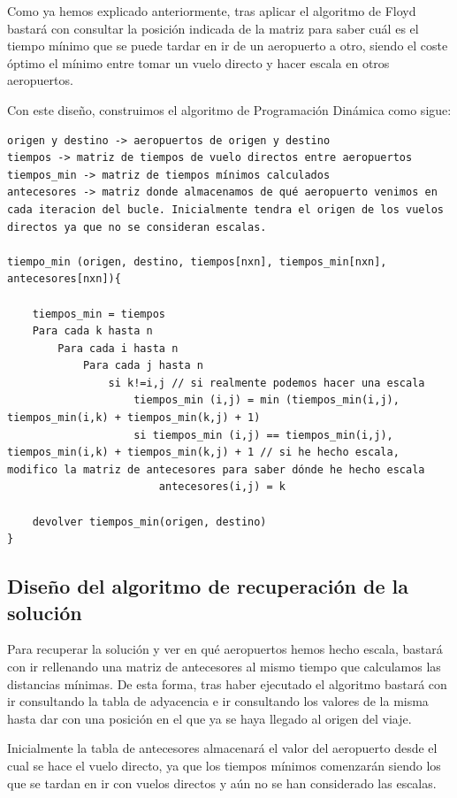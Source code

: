 Como ya hemos explicado anteriormente, tras aplicar el algoritmo de Floyd bastará con consultar la posición indicada de la matriz para saber cuál es el tiempo mínimo que se puede tardar en ir de un aeropuerto a otro, siendo el coste óptimo el mínimo entre tomar un vuelo directo y hacer escala en otros aeropuertos.

Con este diseño, construimos el algoritmo de Programación Dinámica como sigue:

\begin{lstlisting}
origen y destino -> aeropuertos de origen y destino
tiempos -> matriz de tiempos de vuelo directos entre aeropuertos
tiempos_min -> matriz de tiempos mínimos calculados
antecesores -> matriz donde almacenamos de qué aeropuerto venimos en cada iteracion del bucle. Inicialmente tendra el origen de los vuelos directos ya que no se consideran escalas.

tiempo_min (origen, destino, tiempos[nxn], tiempos_min[nxn], antecesores[nxn]){

    tiempos_min = tiempos
    Para cada k hasta n
        Para cada i hasta n
            Para cada j hasta n
                si k!=i,j // si realmente podemos hacer una escala
                    tiempos_min (i,j) = min (tiempos_min(i,j), tiempos_min(i,k) + tiempos_min(k,j) + 1)
                    si tiempos_min (i,j) == tiempos_min(i,j), tiempos_min(i,k) + tiempos_min(k,j) + 1 // si he hecho escala, modifico la matriz de antecesores para saber dónde he hecho escala
                        antecesores(i,j) = k
                    
    devolver tiempos_min(origen, destino)                   
}

\end{lstlisting}

\subsection{Diseño del algoritmo de recuperación de la solución}

Para recuperar la solución y ver en qué aeropuertos hemos hecho escala, bastará con ir rellenando una matriz de antecesores al mismo tiempo que calculamos las distancias mínimas. De esta forma, tras haber ejecutado el algoritmo bastará con ir consultando la tabla de adyacencia e ir consultando los valores de la misma hasta dar con una posición en el que ya se haya llegado al origen del viaje.

Inicialmente la tabla de antecesores almacenará el valor del aeropuerto desde el cual se hace el vuelo directo, ya que los tiempos mínimos comenzarán siendo los que se tardan en ir con vuelos directos y aún no se han considerado las escalas.

